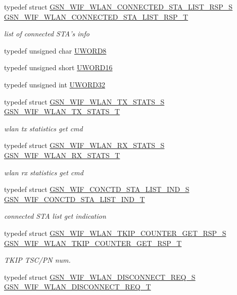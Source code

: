 \begin{DoxyCompactItemize}
typedef struct \hyperlink{a00375}{GSN\_\-WIF\_\-WLAN\_\-CONNECTED\_\-STA\_\-LIST\_\-RSP\_\-S} \hyperlink{a00677_ga0cb3a8c19998e8db9e9251598e564b23}{GSN\_\-WIF\_\-WLAN\_\-CONNECTED\_\-STA\_\-LIST\_\-RSP\_\-T}
\begin{DoxyCompactList}\small\item\em list of connected STA's info \end{DoxyCompactList}\item 
typedef unsigned char \hyperlink{a00677_gad4e70fe7a239280a211703cce48b43da}{UWORD8}
\item 
typedef unsigned short \hyperlink{a00677_ga9346f50cd1a0569efeb685f429a562ff}{UWORD16}
\item 
typedef unsigned int \hyperlink{a00677_gad0599cef3ddc489e9b2fe8afc3159f12}{UWORD32}
\item 
typedef struct \hyperlink{a00410}{GSN\_\-WIF\_\-WLAN\_\-TX\_\-STATS\_\-S} \hyperlink{a00677_gadedc886d92dbab6910156f707795905d}{GSN\_\-WIF\_\-WLAN\_\-TX\_\-STATS\_\-T}
\begin{DoxyCompactList}\small\item\em wlan tx statistics get cmd \end{DoxyCompactList}\item 
typedef struct \hyperlink{a00398}{GSN\_\-WIF\_\-WLAN\_\-RX\_\-STATS\_\-S} \hyperlink{a00677_ga1bb08fff4c3ba2c6027ad054755e4df2}{GSN\_\-WIF\_\-WLAN\_\-RX\_\-STATS\_\-T}
\begin{DoxyCompactList}\small\item\em wlan rx statistics get cmd \end{DoxyCompactList}\item 
typedef struct \hyperlink{a00321}{GSN\_\-WIF\_\-CONCTD\_\-STA\_\-LIST\_\-IND\_\-S} \hyperlink{a00677_ga7709929fb1c332b2853a998d3b305561}{GSN\_\-WIF\_\-CONCTD\_\-STA\_\-LIST\_\-IND\_\-T}
\begin{DoxyCompactList}\small\item\em connected STA list get indication \end{DoxyCompactList}\item 
typedef struct \hyperlink{a00407}{GSN\_\-WIF\_\-WLAN\_\-TKIP\_\-COUNTER\_\-GET\_\-RSP\_\-S} \hyperlink{a00677_ga4c920262f319d5fe619f45ee687d827b}{GSN\_\-WIF\_\-WLAN\_\-TKIP\_\-COUNTER\_\-GET\_\-RSP\_\-T}
\begin{DoxyCompactList}\small\item\em TKIP TSC/PN num. \end{DoxyCompactList}\item 
typedef struct \hyperlink{a00380}{GSN\_\-WIF\_\-WLAN\_\-DISCONNECT\_\-REQ\_\-S} \hyperlink{a00677_gaf8a8c7854be001d295e7a84a9512a1d7}{GSN\_\-WIF\_\-WLAN\_\-DISCONNECT\_\-REQ\_\-T}

\end{DoxyCompactItemize}
